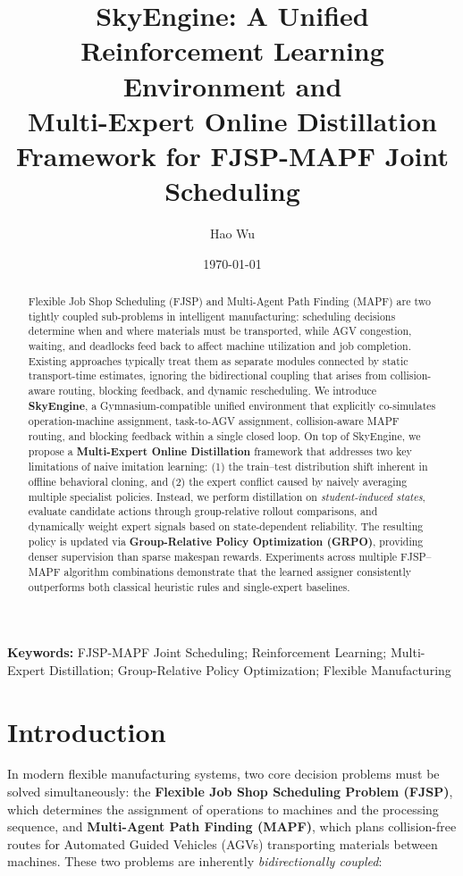 \documentclass[11pt,a4paper]{article}
\title{\textbf{SkyEngine: A Unified Reinforcement Learning Environment and\\
Multi-Expert Online Distillation Framework for FJSP-MAPF Joint Scheduling}}
\author{
    Hao Wu \quad
}
\date{\today}
\begin{document}
\maketitle

\begin{abstract}
Flexible Job Shop Scheduling (FJSP) and Multi-Agent Path Finding (MAPF) are two tightly coupled sub-problems in intelligent manufacturing: scheduling decisions determine when and where materials must be transported, while AGV congestion, waiting, and deadlocks feed back to affect machine utilization and job completion. Existing approaches typically treat them as separate modules connected by static transport-time estimates, ignoring the bidirectional coupling that arises from collision-aware routing, blocking feedback, and dynamic rescheduling. We introduce \textbf{SkyEngine}, a Gymnasium-compatible unified environment that explicitly co-simulates operation-machine assignment, task-to-AGV assignment, collision-aware MAPF routing, and blocking feedback within a single closed loop. On top of SkyEngine, we propose a \textbf{Multi-Expert Online Distillation} framework that addresses two key limitations of naive imitation learning: (1) the train--test distribution shift inherent in offline behavioral cloning, and (2) the expert conflict caused by naively averaging multiple specialist policies. Instead, we perform distillation on \emph{student-induced states}, evaluate candidate actions through group-relative rollout comparisons, and dynamically weight expert signals based on state-dependent reliability. The resulting policy is updated via \textbf{Group-Relative Policy Optimization (GRPO)}, providing denser supervision than sparse makespan rewards. Experiments across multiple FJSP--MAPF algorithm combinations demonstrate that the learned assigner consistently outperforms both classical heuristic rules and single-expert baselines.
\end{abstract}

\textbf{Keywords:} FJSP-MAPF Joint Scheduling; Reinforcement Learning; Multi-Expert Distillation; Group-Relative Policy Optimization; Flexible Manufacturing

\section{Introduction}
\label{sec:intro}

In modern flexible manufacturing systems, two core decision problems must be solved simultaneously: the \textbf{Flexible Job Shop Scheduling Problem (FJSP)}, which determines the assignment of operations to machines and the processing sequence, and \textbf{Multi-Agent Path Finding (MAPF)}, which plans collision-free routes for Automated Guided Vehicles (AGVs) transporting materials between machines. These two problems are inherently \emph{bidirectionally coupled}:
\end{document}
